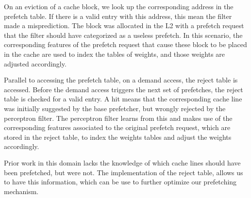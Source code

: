 On an eviction of a cache block, we look up the corresponding address
in the prefetch table. If there is a valid entry with this address, 
this mean the filter made a misprediction. The block was allocated in the
L2 with a prefetch request that the filter should have categorized 
as a useless prefetch. In this scenario, the corresponding features of the
prefetch request that cause these block to be placed in the cache are used
to index the tables of weights, and those weights are adjusted accordingly. 


Parallel to accessing the prefetch table, on a demand access, 
the reject table is accessed. Before
the demand access triggers the next set of prefetches, the reject table is
checked for a valid entry.  A hit means that the corresponding cache line was
initially suggested by the base prefetcher, but wrongly rejected by the
perceptron filter. The perceptron filter learns from this and makes use of the
corresponding features associated to the original prefetch request, which are
stored in the reject table, to index the weights tables and adjust the weights
accordingly.

Prior work in this domain lacks the knowledge of which cache lines should have 
been prefetched, but were not. The implementation of the reject table,
allows us to have this information, which can be use to further optimize
our prefetching mechanism.

